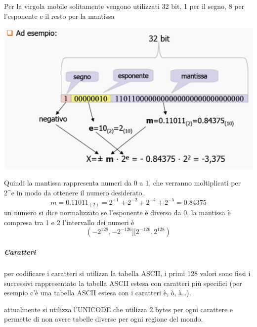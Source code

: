\documentclass[
  paper=a4,
  oneside  ,captions=tableheading
]{scrbook}
\begin{document}
Per la virgola mobile solitamente vengono utilizzati 32 bit, 1 per il
segno, 8 per l'esponente e il resto per la mantissa

\includegraphics{./image/image-20201212112608865.png}

Quindi la mantissa rappresenta numeri da 0 a 1, che verranno
moltiplicati per 2\^{}e in modo da ottenere il numero desiderato. \[
m=0.11011_{(2)} =  2^{-1}+2^{-2}+2^{-4}+2^{-5} = 0.84375
\] un numero si dice normalizzato se l'esponente è diverso da 0, la
mantissa è compresa tra 1 e 2 l'intervallo dei numeri è \[
(-2^{128}, -2^{-126}][2^{-126}, 2^{128})
\]

\hypertarget{caratteri}{%
\subparagraph{Caratteri}\label{caratteri}}

per codificare i caratteri si utilizza la tabella ASCII, i primi 128
valori sono fissi i successivi rappresentato la tabella ASCII estesa con
caratteri più specifici (per esempio c'è una tabella ASCII estesa con i
caratteri è, ò, à\ldots).

attualmente si utilizza l'UNICODE che utilizza 2 bytes per ogni
carattere e permette di non avere tabelle diverse per ogni regione del
mondo.
\end{document}
